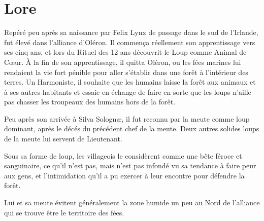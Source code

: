 
\section*{Lore}
Repéré peu après sa naissance par Felix Lynx de passage dans le sud de l'Irlande, \magusbirthname fut élevé dans l'alliance d'Oléron. Il commença réellement son apprentissage vers ses cinq ans, et lors du Rituel des 12 ans découvrit le Loup comme Animal de Cœur. À la fin de son apprentissage, il quitta Oléron, ou les fées marines lui rendaient la vie fort pénible pour aller s'établir dans une forêt à l'intérieur des terres. Un Harmoniste, il souhaite que les humains laisse la forêt aux animaux et à ses autres habitants et essaie en échange de faire en sorte que les loups n'aille pas chasser les troupeaux des humains hors de la forêt.

Peu après son arrivée à Silva Solognæ, il fut reconnu par la meute comme loup dominant, après le décés du précédent chef de la meute. Deux autres solides loups de la meute lui servent de Lieutenant.

Sous sa forme de loup, les villageois le considèrent comme une bête féroce et sanguinaire, ce qu'il n'est pas, mais n'est pas infondé vu sa tendance à faire peur aux gens, et l'intimidation qu'il a pu exercer à leur encontre pour défendre la forêt.

Lui et sa meute évitent généralement la zone humide un peu au Nord de l'alliance qui se trouve être le territoire des fées.


